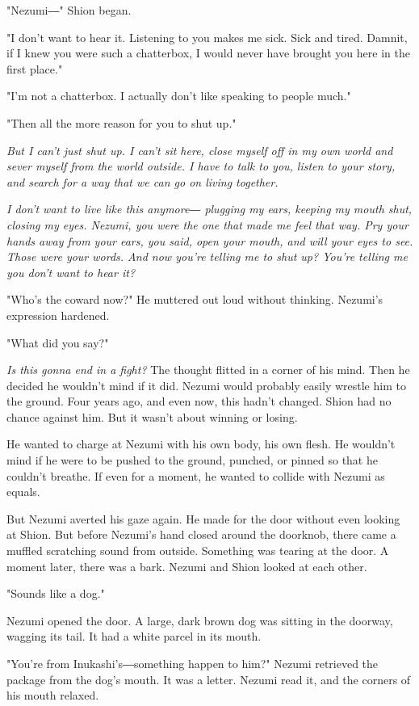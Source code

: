 "Nezumi―" Shion began.

"I don't want to hear it. Listening to you makes me sick. Sick and
tired. Damnit, if I knew you were such a chatterbox, I would never have
brought you here in the first place."

"I'm not a chatterbox. I actually don't like speaking to people much."

"Then all the more reason for you to shut up."

\emph{But I can't just shut up. I can't sit here, close myself off in my own
	world and sever myself from the world outside. I have to talk to you,
	listen to your story, and search for a way that we can go on living
	together.}

\emph{I don't want to live like this anymore― plugging my ears, keeping my
	mouth shut, closing my eyes. Nezumi, you were the one that made me feel
	that way. Pry your hands away from your ears, you said, open your mouth,
	and will your eyes to see. Those were your words. And now you're telling
	me to shut up? You're telling me you don't want to hear it?}

"Who's the coward now?" He muttered out loud without thinking. Nezumi's
expression hardened.

"What did you say?"

\emph{Is this gonna end in a fight?} The thought flitted in a corner of his
mind. Then he decided he wouldn't mind if it did. Nezumi would probably
easily wrestle him to the ground. Four years ago, and even now, this
hadn't changed. Shion had no chance against him. But it wasn't about
winning or losing.

He wanted to charge at Nezumi with his own body, his own flesh. He
wouldn't mind if he were to be pushed to the ground, punched, or pinned
so that he couldn't breathe. If even for a moment, he wanted to collide
with Nezumi as equals.

But Nezumi averted his gaze again. He made for the door without even
looking at Shion. But before Nezumi's hand closed around the doorknob,
there came a muffled scratching sound from outside. Something was
tearing at the door. A moment later, there was a bark. Nezumi and Shion
looked at each other.

"Sounds like a dog."

Nezumi opened the door. A large, dark brown dog was sitting in the
doorway, wagging its tail. It had a white parcel in its mouth.

"You're from Inukashi's―something happen to him?" Nezumi retrieved the
package from the dog's mouth. It was a letter. Nezumi read it, and the
corners of his mouth relaxed.

